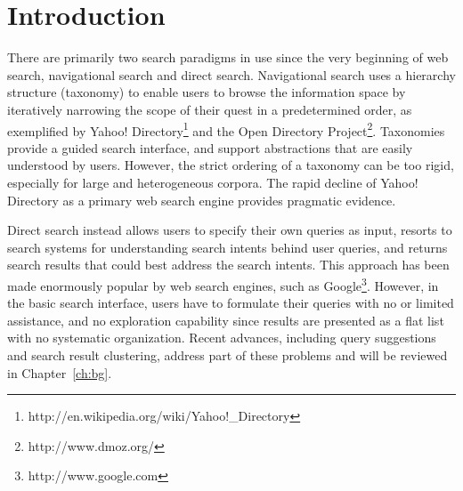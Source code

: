 \chapter{Introduction}
\label{ch:intro}


There are primarily two search paradigms in use since the very beginning of web search, navigational search and direct search. Navigational search uses a hierarchy structure (taxonomy) to enable users to browse the information space by iteratively narrowing the scope of their quest in a predetermined order, as exemplified by Yahoo! Directory\footnote{http://en.wikipedia.org/wiki/Yahoo!\_Directory} and the Open Directory Project\footnote{http://www.dmoz.org/}. Taxonomies provide a guided search interface, and support abstractions that are easily understood by users. However, the strict ordering of a taxonomy can be too rigid, especially for large and heterogeneous corpora. The rapid decline of Yahoo! Directory as a primary web search engine provides pragmatic evidence.

Direct search instead allows users to specify their own queries as input, resorts to search systems for understanding search intents behind user queries, and returns search results that could best address the search intents. This approach has been made enormously popular by web search engines, such as Google\footnote{http://www.google.com}. However, in the basic search interface, users have to formulate their queries with no or limited assistance, and no exploration capability since results are presented as a flat list with no systematic organization. Recent advances, including query suggestions and search result clustering, address part of these problems and will be reviewed in Chapter~\ref{ch:bg}.

